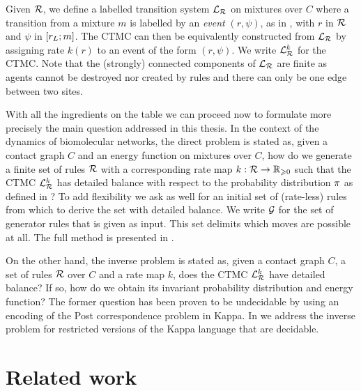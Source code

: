Given $\mathcal{R}$,
we define a labelled transition system $\mathcal{L}_{\mathcal{R}}$
on mixtures over $C$ where
a transition from a mixture $m$ is labelled by
an \emph{event} $(r,\psi)$, as in ,
with $r$ in $\mathcal{R}$ and $\psi$ in $\left[r_L;m\right]$.
The CTMC %
can then be equivalently
constructed from $\mathcal{L}_{\mathcal{R}}$ by assigning
rate $k(r)$ to an event of the form $(r,\psi)$.
We write $\mathcal{L}^k_{\mathcal{R}}$ for the CTMC.
Note that the (strongly) connected components of $\mathcal{L}_{\mathcal{R}}$
are finite as agents cannot be destroyed nor created by rules
and there can only be one edge between two sites.

With all the ingredients on the table
we can proceed now to formulate more precisely
the main question addressed in this thesis.
In the context of the dynamics of biomolecular networks,
the direct problem is stated as,
given a contact graph $C$ and
an energy function on mixtures over $C$,
how do we generate a finite set of rules $\mathcal{R}$
with a corresponding rate map $k: \mathcal{R} \to \mathbb{R}_{\geqslant 0}$
such that the CTMC $\mathcal{L}^k_{\mathcal{R}}$ has detailed balance with respect to
the probability distribution $\pi$ as defined in ?
To add flexibility
we ask as well for an initial set of (rate-less) rules %
from which to derive the set with detailed balance.
We write $\mathcal{G}$ for the set of generator rules
that is given as input.
This set delimits which moves are possible at all.
The full method is presented in .

On the other hand, the inverse problem is stated as,
given a contact graph $C$,
a set of rules $\mathcal{R}$ over $C$
and a rate map $k$,
does the CTMC $\mathcal{L}^k_{\mathcal{R}}$ have detailed balance?
If so, how do we obtain
its invariant probability distribution and energy function?
The former question has been proven to be undecidable by \citet{et1}
using an encoding of the Post correspondence problem \citep{post}
in Kappa.
In  we address the inverse problem for
restricted versions of the Kappa language
that are decidable.


\section{Related work}

